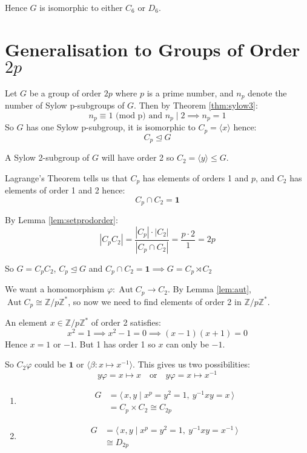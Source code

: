 \documentclass[a4paper, oneside, 12pt, final]{article}
\theoremstyle{definition}
\DeclareMathOperator{\Aut}{Aut}
\newcommand{\Z}{\mathbb{Z}}
\newcommand{\Zn}[1]{\Z/#1\Z}
\begin{document}
Hence \(G\) is isomorphic to either \(C_6\) or \(D_6\).

\section{Generalisation to Groups of Order \(2p\)}
Let \(G\) be a group of order \(2p\) where \(p\) is a prime number, and \(n_p\)
denote the number of Sylow p-subgroups of \(G\).
Then by Theorem \ref{thm:sylow3}:
\[n_p \equiv 1 \text{ (mod p) and } n_p \mid 2 \implies n_p = 1\]
So \(G\) has one Sylow p-subgroup, it is isomorphic to \(C_p = \langle x
\rangle\) hence:
\[C_p \unlhd G\]

A Sylow 2-subgroup of \(G\) will have order 2 so \(C_2 = \langle y \rangle
\leqslant G\).

Lagrange's Theorem tells us that \(C_p\) has elements of orders 1 and \(p\),
and \(C_2\) has elements of order 1 and 2 hence:
\[C_p \cap C_2 = \bm{1}\]

By Lemma \ref{lem:setprodorder}:
\[|C_p C_2| = \frac{|C_p| \cdot |C_2|}{|C_p \cap C_2|} = \frac{p \cdot 2}{1} =
2p\]

So \(G = C_p C_2\), \(C_p \unlhd G\) and \(C_p \cap C_2 = \bm{1} \implies G =
C_p \rtimes C_2\)

We want a homomorphism \(\varphi:\Aut{C_p} \to C_2\).
By Lemma \ref{lem:aut}, \(\Aut{C_p} \cong \Zn{p}^*\), so now we need to find elements of order 2 in \(\Zn{p}^*\).

An element \(x \in \Zn{p}^*\) of order 2 satisfies:
\[x^2 = 1 \implies x^2 - 1 = 0 \implies (x-1)(x+1) = 0\]
Hence \(x = 1\) or \(-1\).
But 1 has order 1 so \(x\) can only be \(-1\).

So \(C_2\varphi\) could be \(\bm{1}\) or \(\langle \beta:x \mapsto x^{-1}
\rangle\). This gives us two possibilities:
\[y\varphi = x \mapsto x \quad \text{or} \quad y\varphi = x \mapsto x^{-1}\]

\begin{enumerate}
    \item
        \begin{equation*}
        \begin{aligned}
            G &= \langle\, x, y \mid x^p = y^2 = 1,\ y^{-1}xy = x \,\rangle \\
            &= C_p \times C_2 \cong C_{2p}
        \end{aligned}
        \end{equation*}
    \item
        \begin{equation*}
        \begin{aligned}
            G &= \langle\, x, y \mid x^p = y^2 = 1,\ y^{-1}xy = x^{-1}
            \,\rangle \\
            &\cong D_{2p}
        \end{aligned}
        \end{equation*}
\end{enumerate}
\end{document}
